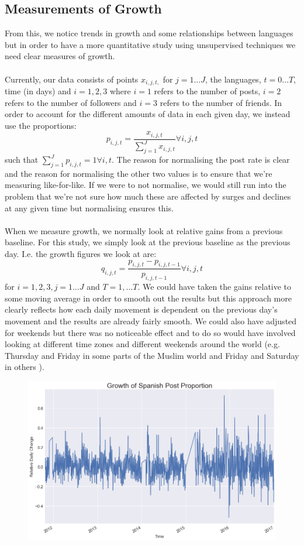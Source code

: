 \documentclass[12pt]{article}
\begin{document}
\subsection{Measurements of Growth}
From this, we notice trends in growth and some relationships between languages but in order to have a more quantitative study using unsupervised techniques we need clear measures of growth. \\\\
Currently, our data consists of points $x_{i,j,t,}$ for $j=1\ldots J$, the languages, $t=0 \ldots T$, time (in days) and $i=1,2,3$ where $i=1$ refers to the number of posts, $i=2$ refers to the number of followers and $i=3$ refers to the number of friends. In order to account for the different amounts of data in each given day, we instead use the proportions: $$p_{i,j,t} = \frac{x_{i,j,t}}{\sum_{j=1}^{J} x_{i,j,t}} \forall i,j,t$$ such that $\sum_{j=1}^{J} p_{i,j,t} = 1 \forall i,t$. The reason for normalising the post rate is clear and the reason for normalising the other two values is to ensure that we're measuring like-for-like. If we were to not normalise, we would still run into the problem that we're not sure how much these are affected by surges and declines at any given time but normalising ensures this. \\\\
When we measure growth, we normally look at relative gains from a previous baseline. For this study, we simply look at the previous baseline as the previous day. I.e. the growth figures we look at are:
$$ q_{i,j,t} = \frac{p_{i,j,t} - p_{i,j,t-1}}{p_{i,j,t-1}} \forall i,j,t$$ for $i=1,2,3, j = 1 \ldots J$ and $T=1,\ldots T$. We could have taken the gains relative to some moving average in order to smooth out the results but this approach more clearly reflects how each daily movement is dependent on the previous day's movement and the results are already fairly smooth. We could also have adjusted for weekends but there was no noticeable effect and to do so would have involved looking at different time zones and different weekends around the world (e.g. Thursday and Friday in some parts of the Muslim world and Friday and Saturday in others \cite{Weekends}).
\FloatBarrier
\begin{figure}[hbtp]\centering
\includegraphics[width=\textwidth,clip]{images/SpanishProportionGrowth.png}
\end{figure}
\FloatBarrier
\newpage
\end{document}
